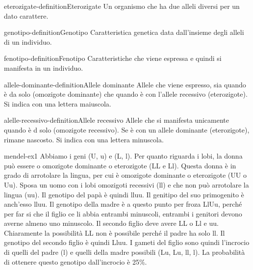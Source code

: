 \documentclass[preview]{standalone}
\begin{document}
\begin{snippetdefinition}{eterozigate-definition}{Eterozigate}
    Un organismo che ha due alleli diversi per un dato carattere.
\end{snippetdefinition}

\begin{snippetdefinition}{genotipo-definition}{Genotipo}
    Caratteristica genetica data dall'insieme degli alleli di un individuo.
\end{snippetdefinition}

\begin{snippetdefinition}{fenotipo-definition}{Fenotipo}
    Caratteristiche che viene espressa e quindi si manifesta in un individuo.
\end{snippetdefinition}

\begin{snippetdefinition}{allele-dominante-definition}{Allele dominante}
    Allele che viene espresso, sia quando è da solo (omozigote dominante) che
    quando è con l'allele recessivo (eterozigote). Si indica con una lettera maiuscola.
\end{snippetdefinition}

\begin{snippetdefinition}{alelle-recessivo-definition}{Allele recessivo}
    Allele che si manifesta unicamente quando è d solo (omozigote recessivo).
    Se è con un allele dominante (eterozigote), rimane nascosto. Si indica con una lettera minuscola.
\end{snippetdefinition}


\begin{snippetexercise}{mendel-ex1}{}
    Abbiamo i geni (U, u) e (L, l).
    Per quanto riguarda i lobi, la donna può essere o omozigote dominante o eterozigote
    (LL e Ll). Questa donna è in grado di arrotolare la lingua, per cui è
    omozigote dominante o eterozigote (UU o Uu).
    Sposa un uomo con i lobi omozigoti recessivi (ll) e che non può arrotolare la lingua
    (uu). Il genotipo del papà è quindi lluu. Il genitipo del suo primogenito 
    è anch'esso lluu.
    Il genotipo della madre è a questo punto per froza LlUu, perché
    per far si che il figlio ce li abbia entrambi minuscoli, entrambi
    i genitori devono averne almeno uno minuscolo.
    Il secondo figlio deve avere LL o Ll e uu. Chiaramente la possibilità
    LL non è possibile perché il padre ha solo ll.
    Il genotipo del secondo figlio è quindi Lluu.
    I gameti del figlio sono quindi l'incrocio di quelli del padre (l)
    e quelli della madre possibili (Lu, Lu, ll, l).
    La probabilità di ottenere questo genotipo dall'incrocio è 25\%.
\end{snippetexercise}
\end{document}
